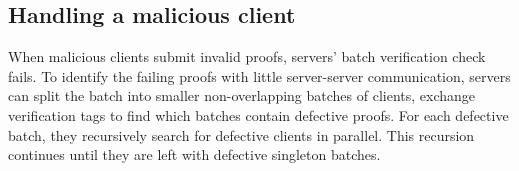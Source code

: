 \subsection{Handling a malicious client}
When malicious clients submit invalid proofs, servers' batch verification check fails. To identify the failing proofs with little server-server communication, servers can split the batch into smaller non-overlapping batches of clients, exchange verification tags to find which batches contain defective proofs. For each defective batch, they recursively search for defective clients in parallel. This recursion continues until they are left with defective singleton batches.



%
